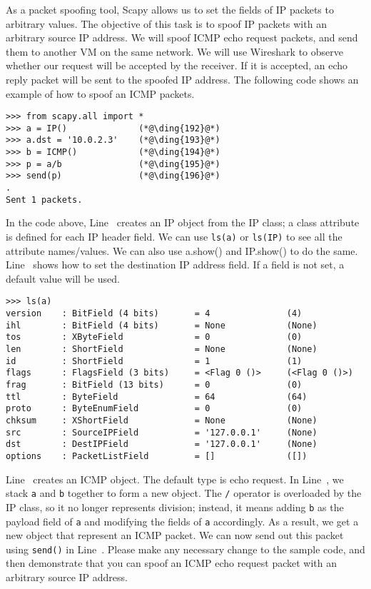 As a packet spoofing tool, Scapy allows us to set the fields of 
IP packets to arbitrary values. The objective of this 
task is to spoof IP packets with an arbitrary source IP address. 
We will spoof ICMP echo request packets, and send them to another VM on
the same network. We will use Wireshark to observe
whether our request will be accepted by the receiver. If it is accepted, an
echo reply packet will be sent to the spoofed IP address. 
The following code shows an example of how to spoof an ICMP packets.


\begin{lstlisting}
>>> from scapy.all import *
>>> a = IP()              (*@\ding{192}@*)
>>> a.dst = '10.0.2.3'    (*@\ding{193}@*)
>>> b = ICMP()            (*@\ding{194}@*)
>>> p = a/b               (*@\ding{195}@*)
>>> send(p)               (*@\ding{196}@*)
.
Sent 1 packets.
\end{lstlisting}
 

In the code above, Line~ creates an IP object from the IP class; 
a class attribute is defined for each IP header field. We
can use \texttt{ls(a)} or \texttt{ls(IP)} to see all 
the attribute names/values. We can also use a.show() and IP.show() to do
the same. Line~ shows how to set the destination 
IP address field. If a field is not set, a default value will be 
used. 

\begin{lstlisting}
>>> ls(a)
version    : BitField (4 bits)       = 4               (4)
ihl        : BitField (4 bits)       = None            (None)
tos        : XByteField              = 0               (0)
len        : ShortField              = None            (None)
id         : ShortField              = 1               (1)
flags      : FlagsField (3 bits)     = <Flag 0 ()>     (<Flag 0 ()>)
frag       : BitField (13 bits)      = 0               (0)
ttl        : ByteField               = 64              (64)
proto      : ByteEnumField           = 0               (0)
chksum     : XShortField             = None            (None)
src        : SourceIPField           = '127.0.0.1'     (None)
dst        : DestIPField             = '127.0.0.1'     (None)
options    : PacketListField         = []              ([])
\end{lstlisting}
 

Line~ creates an ICMP object. The default type is echo request.
In Line~, we stack \texttt{a} and \texttt{b} together to 
form a new object. The \texttt{/} operator is overloaded by the
IP class, so it no longer represents division; instead, it means 
adding \texttt{b} as the payload field of \texttt{a} and modifying
the fields of \texttt{a} accordingly. As a result, we get a new 
object that represent an ICMP packet. We can now send out this packet 
using \texttt{send()} in Line~. Please make any necessary change
to the sample code, and then demonstrate that you can spoof an ICMP echo
request packet with an arbitrary source IP address. 




